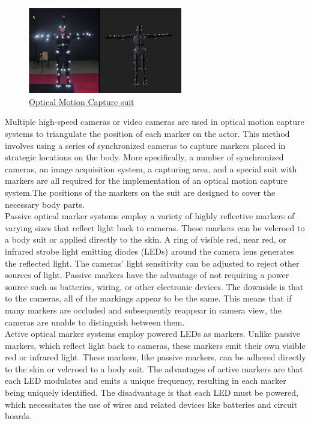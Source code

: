 
\begin{figure}[h]
	\centering
	\includegraphics[width=0.6\textwidth]{figures/background/Optical.png}
	\captionsetup{labelformat=empty}
	\caption{\href{https://www.researchgate.net/profile/Jacek-Hordyj/publication/283152771/figure/fig1/AS:669997391159296@1536751234023/Actor-wearing-suit-adjusted-for-optical-motion-capture-on-the-left-Virtual-model.png}
	{Optical Motion Capture suit}}
\end{figure}

Multiple high-speed cameras   \cite{Optical Motion Capture: Theory and Implementation,MOTION CAPTURE TO BUILD A FOUNDATION FOR A COMPUTER-CONTROLLED INSTRUMENT BY STUDY OF CLASSICAL GUITAR PERFORMANCE} or video cameras are used in optical motion capture systems to triangulate the position of each marker on the actor. This method involves using a series of synchronized cameras to capture markers placed in strategic locations on the body. More specifically, a number of synchronized cameras, an image acquisition system, a capturing area, and a special suit with markers are all required for the implementation of an optical motion capture system.The positions of the markers on the suit are designed to cover the necessary body parts.\\

Passive optical marker systems employ a variety of highly reflective markers of varying sizes that reflect light back to cameras. These markers can be velcroed to a body suit or applied directly to the skin. A ring of visible red, near red, or infrared strobe light emitting diodes (LEDs) around the camera lens generates the reflected light. The cameras' light sensitivity can be adjusted to reject other sources of light. Passive markers have the advantage of not requiring a power source such as batteries, wiring, or other electronic devices. The downside is that to the cameras, all of the markings appear to be the same. This means that if many markers are occluded and subsequently reappear in camera view, the cameras are unable to distinguish between them.\\

Active optical marker systems employ powered LEDs as markers.
Unlike passive markers, which reflect light back to cameras, these markers emit their own visible red or infrared light. These markers, like passive markers, can be adhered directly to the skin or velcroed to a body suit. The advantages of active markers are that each LED modulates and emits a unique frequency, resulting in each marker being uniquely identified. The disadvantage is that each LED must be powered, which necessitates the use of wires and related devices like batteries and circuit boards.
